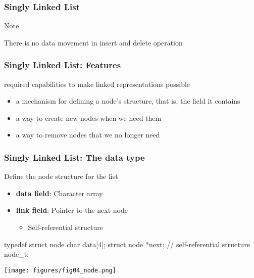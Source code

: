 \documentclass[newPxFont,sthlmFooter,nooffset]{beamer}
\begin{document}
\begin{frame}[t]
  \frametitle{Singly Linked List}
\bigskip
  \begin{block}{Note}
    \begin{center}
\bigskip

      There is no data movement in insert and delete operation

\bigskip
    \end{center}

  \end{block}
\end{frame}

\begin{frame}[t]
  \frametitle{Singly Linked List: Features}
  
required capabilities to make linked representations possible
\begin{itemize}
\item a mechanism for defining a node’s structure, that is, the
  field it contains
\item a way to create new nodes when we need them
\item a way to remove nodes that we no longer need
\end{itemize}

\end{frame}

\begin{frame}[t, fragile]
  \frametitle{Singly Linked List: The data type}
  Define the node structure for the list
  \begin{itemize}
  \item \textbf{data field}: Character array
  \item \textbf{link field}: Pointer to the next node
    \begin{itemize}
    \item Self-referential structure
    \end{itemize}
  \end{itemize}

  \begin{ncodedef}
typedef struct node {
    char data[4];
    struct node *next; // self-referential structure
} node_t;
  \end{ncodedef}
  \begin{center}
    \texttt{[image: figures/fig04\_node.png]}
  \end{center}

\end{frame}
\end{document}
